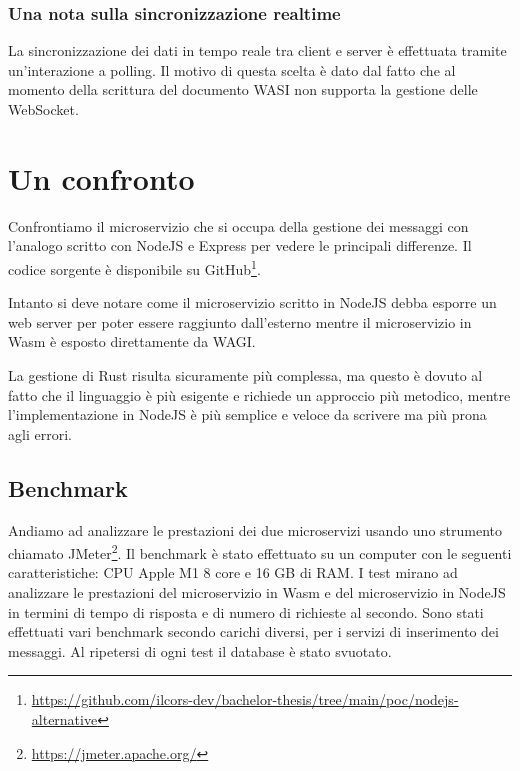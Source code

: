 
\subsubsection{Una nota sulla sincronizzazione realtime}
La sincronizzazione dei dati in tempo reale tra client e server è effettuata tramite un'interazione a polling. Il motivo
di questa scelta è dato dal fatto che al momento della scrittura del documento WASI non supporta la gestione delle
WebSocket.

\section{Un confronto}
Confrontiamo il microservizio che si occupa della gestione dei messaggi con l'analogo scritto con NodeJS e Express per
vedere le principali differenze. Il codice sorgente è disponibile su
GitHub\footnote{\url{https://github.com/ilcors-dev/bachelor-thesis/tree/main/poc/nodejs-alternative}}.

Intanto si deve notare come il microservizio scritto in NodeJS debba esporre un web server per poter essere raggiunto
dall'esterno mentre il microservizio in Wasm è esposto direttamente da WAGI.

La gestione di Rust risulta sicuramente più complessa, ma questo è dovuto al fatto che il linguaggio è più esigente e
richiede un approccio più metodico, mentre l'implementazione in NodeJS è più semplice e veloce da scrivere ma più prona
agli errori.

\subsection{Benchmark}
Andiamo ad analizzare le prestazioni dei due microservizi usando uno strumento chiamato
JMeter\footnote{\url{https://jmeter.apache.org/}}. Il benchmark è stato effettuato su un computer con le seguenti
caratteristiche: CPU Apple M1 8 core e 16 GB di RAM. I test mirano ad analizzare le prestazioni del microservizio in
Wasm e del microservizio in NodeJS in termini di tempo di risposta e di numero di richieste al secondo. Sono stati
effettuati vari benchmark secondo carichi diversi, per i servizi di inserimento dei messaggi. Al ripetersi di ogni test
il database è stato svuotato.

